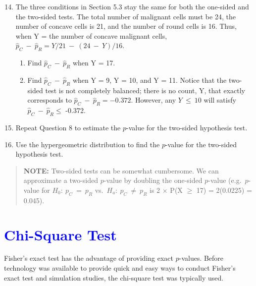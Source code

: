 \documentclass[
]{report}
\begin{document}
\begin{enumerate}
  \setcounter{enumi}{13}

  \item The three conditions in Section 5.3 stay the same for both the one-sided and the two-sided tests. The total number of malignant cells must be 24, the number of concave cells is 21, and the number of round cells is 16. Thus, when Y = the number of concave malignant cells, $\scriptstyle \hat p_C \ -\  \hat p_R = Y/21 \ -\  (24 \ -\  Y)/16$. 

\begin{enumerate}
  \item Find $\scriptstyle \hat p_C \ -\  \hat p_R$ when Y = 17.  
 
  \item Find $\scriptstyle \hat p_C \ -\  \hat p_R$ when Y = 9, Y = 10, and Y = 11. Notice that the two-sided test is not completely balanced; there is no count, Y, that exactly corresponds to $\scriptstyle \hat p_C \ -\  \hat p_R = -0.372$. However, any $\scriptstyle Y\  \le \ 10$ will satisfy $\scriptstyle \hat p_C \ -\  \hat p_R \le$ -0.372.  
\end{enumerate}

\item Repeat Question 8 to estimate the $\scriptstyle p$-value for the two-sided hypothesis test.  

\item Use the hypergeometric distribution to find the $\scriptstyle p$-value for the two-sided hypothesis test.
\end{enumerate}

\begin{quote}
\textbf{NOTE:} Two-sided tests can be somewhat cumbersome. We can approximate a two-sided \(\scriptstyle p\)-value by doubling the one-sided \(\scriptstyle p\)-value (e.g.~\(\scriptstyle p\)-value for \(\scriptstyle H_0:\  p_C \ =\  p_R\) vs.~\(\scriptstyle H_a:\  p_C \ \neq \ p_R\) is 2 \(\times\) P(X \(\ge\) 17) = 2(0.0225) = 0.045).
\end{quote}

\hypertarget{section-53}{%
\section{\texorpdfstring{\textcolor{blue}{Chi-Square Test}}{}}\label{section-53}}

Fisher's exact test has the advantage of providing exact \(\scriptstyle p\)-values. Before technology was available to provide quick and easy ways to conduct Fisher's exact test and simulation studies, the chi-square test was typically used.
\end{document}
